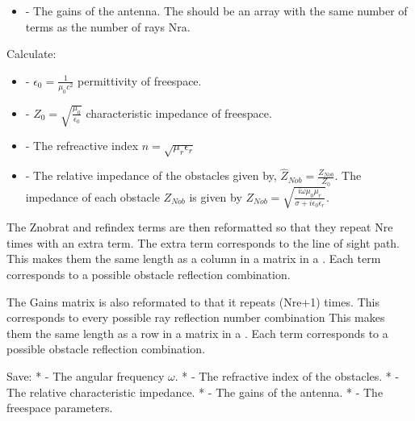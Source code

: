 \documentclass[letterpaper,10pt,english]{sphinxmanual}
\begin{document}
\begin{fulllineitems}
\begin{itemize}
\item {} 
        - The gains of the antenna. The should be an array with   the same number of terms as the number of rays Nra.

\end{itemize}

Calculate:
\begin{itemize}
\item {} 
   - \(\epsilon_0=\frac{1}{\mu_0 c^2}\)  permittivity of   freespace.

\item {} 
     - \(Z_0=\sqrt{\frac{\mu_0}{\epsilon_0}}\) characteristic   impedance of freespace.

\item {} 
 - The refreactive index   \(n=\sqrt{\mu_r\epsilon_r}\)

\item {} 
- The relative impedance of the obstacles given by,
\(\hat{Z}_{Nob}=\frac{Z_{Nob}}{Z_0}\). The impedance of each     obstacle \(Z_{Nob}\) is given by     \(Z_{Nob}=\sqrt{\frac{i\omega\mu_0\mu_r}{\sigma+i\epsilon_0\epsilon_r}}\).

\end{itemize}

The Znobrat and refindex terms are then reformatted so that they   repeat Nre times with an extra term. The extra term corresponds to   the line of sight path. This makes them the same length as a column   in a matrix in a {\hyperref[index:DictionarySparseMatrix.DS]{}}.   Each term corresponds to a possible obstacle reflection combination.

The Gains matrix is also reformated to that it repeats (Nre+1) times.   This corresponds to every possible ray reflection number combination   This makes them the same length as a row in a matrix in a   {\hyperref[index:DictionarySparseMatrix.DS]{}}.   Each term corresponds to a possible obstacle reflection combination.

Save:
* - The angular frequency \(\omega\).
*  - The refractive index of the obstacles.
*   - The relative characteristic impedance.
*   - The gains of the antenna.
* - The freespace parameters.


\end{fulllineitems}
\end{document}

